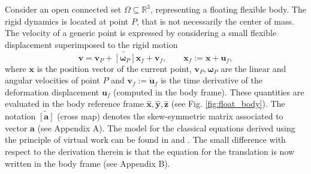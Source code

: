 \documentclass{svjour3}                     %
\newcommand{\crmat}[1]{\ensuremath{\widetilde{\left[#1\right]}}}
\begin{document}
Consider an open connected set $\Omega \subseteq \mathbb{R}^3$, representing a floating flexible body.  The rigid dynamics is located at point $P$, that is not necessarily the center of mass. The velocity of a generic point is expressed by considering a small flexible displacement superimposed to the rigid motion
\[
\bm{v} = \bm{v}_P + \crmat{\bm{\omega}_P}\bm{x}_f + \bm{v}_f,  \qquad \bm{x}_f := \bm{x}+\bm{u}_f,
\]
where $\bm{x}$ is the position vector of the current point, $\bm{v}_P, \bm{\omega}_P$ are the linear and angular velocities of point $P$  and $\bm{v}_f := \dot{\bm{u}}_f$ is the time derivative of the deformation displacement $\bm{u}_f$ (computed in the body frame). These quantities are evaluated in the body reference frame $\widehat{\bm{x}}, \widehat{\bm{y}}, \widehat{\bm{z}}$ (see Fig. \ref{fig:float_body}). The notation $\crmat{\bm{a}}$ (cross map) denotes the skew-symmetric matrix associated to vector $\bm{a}$ (see Appendix A). The model for the classical equations derived using the principle of virtual work can be found in \cite{MB_Daepde} and \cite[Chapter 4]{simeon2013computational}. The small difference with respect to the derivation therein is that the equation for the translation is now written in the body frame (see Appendix B). 
\end{document}
